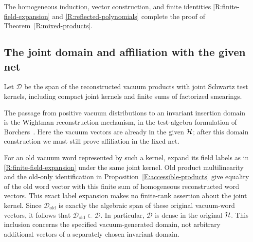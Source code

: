 The homogeneous induction, vector construction, and finite
identities \eqref{R:finite-field-expansion} and
\eqref{R:reflected-polynomials} complete the proof of
Theorem~\ref{R:mixed-products}.

\subsection{The joint domain and affiliation with the given net}

Let $\mathcal D$ be the span of the reconstructed vacuum products
with joint Schwartz test kernels, including compact joint kernels
and finite sums of factorized smearings.

The passage from positive vacuum distributions to an invariant
insertion domain is the Wightman reconstruction mechanism, in the
test-algebra formulation of Borchers~\cite{Wightman1956,Borchers1962}.
Here the vacuum vectors are already in the given $\mathcal H$; after this
domain construction we must still prove affiliation in the fixed net.

For an old vacuum word represented by such a kernel, expand its field
labels as in
\eqref{R:finite-field-expansion} under the same joint kernel.
Old product multilinearity and the old-only identification in
Proposition~\ref{E:accessible-products} give equality of the old
word vector with this finite sum of homogeneous reconstructed word
vectors.  This exact label expansion makes no finite-rank assertion
about the joint kernel. Since $\mathcal D_{\mathrm{old}}$ is exactly the
algebraic span of these original vacuum-word vectors, it follows that
$\mathcal D_{\mathrm{old}}\subset\mathcal D$. In particular,
$\mathcal D$ is dense in the original $\mathcal H$. This inclusion concerns the
specified vacuum-generated domain, not arbitrary additional vectors of
a separately chosen invariant domain.

